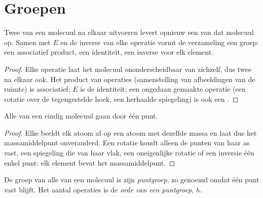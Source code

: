 \section{Groepen}

\begin{proposition}\label{prop:b3:point-groups:closure}
Twee  van een molecuul na elkaar uitvoeren levert
opnieuw een  van dat molecuul op. Samen met $E$ en de
inverse van elke operatie vormt de verzameling  een
groep: een associatief product, een identiteit, een inverse voor elk
element.
\end{proposition}

\begin{proof}
Elke operatie laat het molecuul ononderscheidbaar van zichzelf, dus twee
na elkaar ook. Het product van operaties (samenstelling van afbeeldingen
van de ruimte) is associatief; $E$ is de identiteit; een ongedaan gemaakte
operatie (een rotatie over de tegengestelde hoek, een herhaalde
spiegeling) is ook een .
\end{proof}

\begin{proposition}\label{prop:b3:point-groups:fixed-point}
Alle  van een eindig molecuul gaan door één punt.
\end{proposition}

\begin{proof}
Elke  beeldt elk atoom af op een atoom met dezelfde
massa en laat dus het massamiddelpunt onveranderd. Een rotatie houdt
alleen de punten van haar as vast, een spiegeling die van haar vlak, een
oneigenlijke rotatie of een inversie één enkel punt: elk element bevat het
massamiddelpunt.
\end{proof}

\begin{definition}\label{def:b3:point-groups:point-group}
De groep van alle  van een molecuul is zijn
\emph{puntgroep}, zo genoemd omdat één punt vast blijft.
Het aantal operaties is de
\emph{orde van een puntgroep},
$h$.
\end{definition}

